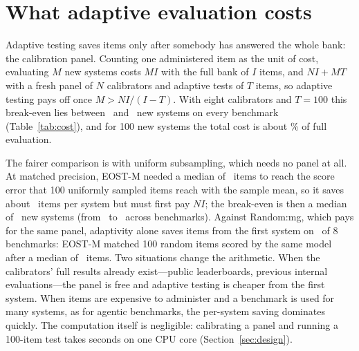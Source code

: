 \section{What adaptive evaluation costs}
\label{sec:cost}

Adaptive testing saves items only after somebody has answered the whole bank: the
calibration panel. Counting one administered item as the unit of cost, evaluating $M$ new
systems costs $MI$ with the full bank of $I$ items, and $NI+MT$ with a fresh panel of $N$
calibrators and adaptive tests of $T$ items, so adaptive testing pays off once
$M>NI/(I-T)$. With eight calibrators and $T=100$ this break-even lies between
\CostBreakFullMin\ and \CostBreakFullMax\ new systems on every benchmark
(Table~\ref{tab:cost}), and for
100 new systems the total cost is about \CostRatioHundred\% of full evaluation.

The fairer comparison is with uniform subsampling, which needs no panel at all. At
matched precision, EOST-M needed a median of \CostItemsNaive\ items to reach the score
error that 100 uniformly sampled items reach with the sample mean, so it saves about
\CostSaveNaive\ items per system but must first pay $NI$; the break-even is then a median of
\CostBreakNaiveMed\ new systems (from \CostBreakNaiveMin\ to \CostBreakNaiveMax\ across
benchmarks). Against Random:mg, which pays for the same panel, adaptivity alone saves
items from the first system on \CostRandomSaveBanks\ of 8 benchmarks: EOST-M matched 100
random items scored by the same model after a median of \CostItemsRandom\ items. Two situations change the arithmetic. When the
calibrators' full results already exist---public leaderboards, previous internal
evaluations---the panel is free and adaptive testing is cheaper from the first system.
When items are expensive to administer and a benchmark is used for many systems, as for
agentic benchmarks, the per-system saving dominates quickly. The computation itself is
negligible: calibrating a panel and running a 100-item test takes seconds on one CPU core
(Section~\ref{sec:design}).


